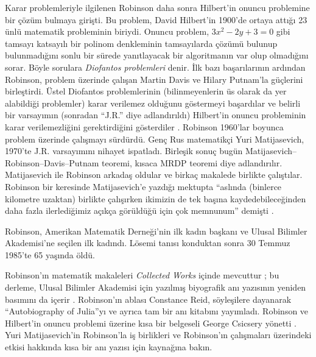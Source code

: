 \documentclass[../../../include/open-logic-section]{subfiles}
\begin{document}
Karar problemleriyle ilgilenen Robinson daha sonra Hilbert'in onuncu
problemine bir çözüm bulmaya girişti. Bu problem, David Hilbert'in 1900'de
ortaya attığı 23 ünlü matematik probleminin biriydi. Onuncu problem, $3x^2 -
2y +3 = 0$ gibi tamsayı katsayılı bir polinom denkleminin tamsayılarda çözümü
bulunup bulunmadığını sonlu bir sürede yanıtlayacak bir algoritmanın var olup
olmadığını sorar. Böyle sorulara \emph{Diofantos problemleri} denir. İlk bazı
başarılarının ardından Robinson, problem üzerinde çalışan Martin Davis ve
Hilary Putnam'la güçlerini birleştirdi. Üstel Diofantos problemlerinin
(bilinmeyenlerin üs olarak da yer alabildiği problemler) karar verilemez
olduğunu göstermeyi başardılar ve belirli bir varsayımın (sonradan ``J.R.''
diye adlandırıldı) Hilbert'in onuncu probleminin karar verilemezliğini
gerektirdiğini gösterdiler \citep{DavisPutnamRobinson1961}. Robinson 1960'lar
boyunca problem üzerinde çalışmayı sürdürdü. Genç Rus matematikçi Yuri
Matijasevich, 1970'te J.R. varsayımını nihayet ispatladı. Birleşik sonuç bugün
Matijasevich--Robinson--Davis--Putnam teoremi, kısaca MRDP teoremi diye
adlandırılır. Matijasevich ile Robinson arkadaş oldular ve birkaç makalede
birlikte çalıştılar. Robinson bir keresinde Matijasevich'e yazdığı mektupta
``aslında (binlerce kilometre uzaktan) birlikte çalışırken ikimizin de tek
başına kaydedebileceğinden daha fazla ilerlediğimiz açıkça görüldüğü için çok
memnunum'' demişti \citep[45]{Matijasevich1992}.

Robinson, Amerikan Matematik Derneği'nin ilk kadın başkanı ve Ulusal Bilimler
Akademisi'ne seçilen ilk kadındı. Lösemi tanısı konduktan sonra 30 Temmuz
1985'te 65 yaşında öldü.

\begin{reading}
Robinson'ın matematik makaleleri \textit{Collected Works} içinde mevcuttur
\citep{Robinson1996}; bu derleme, Ulusal Bilimler Akademisi için yazılmış
biyografik anı yazısının yeniden basımını da içerir \citep{Feferman1994}.
Robinson'ın
ablası Constance Reid, söyleşilere dayanarak ``Autobiography of Julia''yı
\citep{Reid1986} ve ayrıca tam bir anı kitabını \citep{Reid1996} yayımladı.
Robinson ve Hilbert'in onuncu problemi üzerine kısa bir belgeseli George
Csicsery yönetti \citep{Csicsery2016}. Yuri Matijasevich'in Robinson'la iş
birlikleri ve Robinson'ın çalışmaları üzerindeki etkisi hakkında kısa bir anı
yazısı için \citep{Matijasevich1992} kaynağına bakın.
\end{reading}
\end{document}
